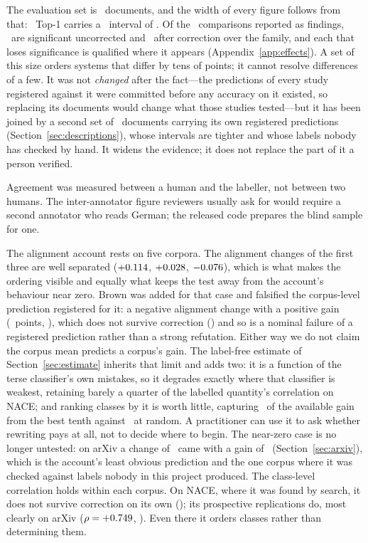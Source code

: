 \documentclass[11pt]{article}
\begin{document}
The evaluation set is \NEVAL\ documents, and the width of every figure follows
from that: \OursTopOne\ Top-1 carries a \CILevel\ interval of \OursCI. Of the
\EffectTests\ comparisons reported as findings, \EffectNominal\ are
significant uncorrected and \EffectHolm\ after correction over the family, and
each that loses significance is qualified where it appears
(Appendix~\ref{app:effects}). A set of this size orders systems that differ by
tens of points; it cannot resolve differences of a few. It was not
\emph{changed} after the fact---the predictions of every study registered
against it were committed before any accuracy on it existed, so replacing its
documents would change what those studies tested---but it has been joined by a second set of
\ExtendedN\ documents carrying its own registered predictions
(Section~\ref{sec:descriptions}), whose intervals are tighter and whose labels
nobody has checked by hand. It widens the evidence; it does not replace the part
of it a person verified.

Agreement was measured between a human and the labeller, not between two humans.
The inter-annotator figure reviewers usually ask for would require a second
annotator who reads German; the released code prepares the blind sample for one.

The alignment account rests on five corpora. The alignment changes of the first
three are well separated ($+0.114$, $+0.028$,
$-0.076$), which is what makes the ordering visible and equally what
keeps the test away from the account's behaviour near zero. Brown was added for
that case and falsified the corpus-level prediction registered for it: a
negative alignment change with a positive gain (\BrownDefGain~points,
\BrownDefPStat), which does not survive correction (\HolmBrownDefStat) and so
is a nominal failure of a registered prediction rather than a strong refutation.
Either way we do not claim the corpus mean predicts a corpus's gain. The
label-free estimate of Section~\ref{sec:estimate} inherits that limit and adds
two: it is a function of the terse classifier's own mistakes, so it degrades
exactly where that classifier is weakest, retaining barely a quarter of the
labelled quantity's correlation on NACE; and ranking classes by it is worth
little, capturing \EstimateTenth\ of the available gain from the best tenth
against \RandomTenth\ at random. A practitioner can use it to ask whether
rewriting pays at all, not to decide where to begin. The
near-zero case is no longer untested: on arXiv a change of \ArxivDescAlign\
came with a gain of \ArxivDescGain\ (Section~\ref{sec:arxiv}), which is the
account's least obvious prediction and the one corpus where it was checked
against labels nobody in this project produced. The class-level correlation holds within each corpus. On NACE, where it was
found by search, it does not survive correction on its own
(\HolmAlignStat); its prospective replications do, most clearly on arXiv
($\rho = +0.749$, \HolmArxivRhoStat). Even there it orders classes rather
than determining them.
\end{document}
